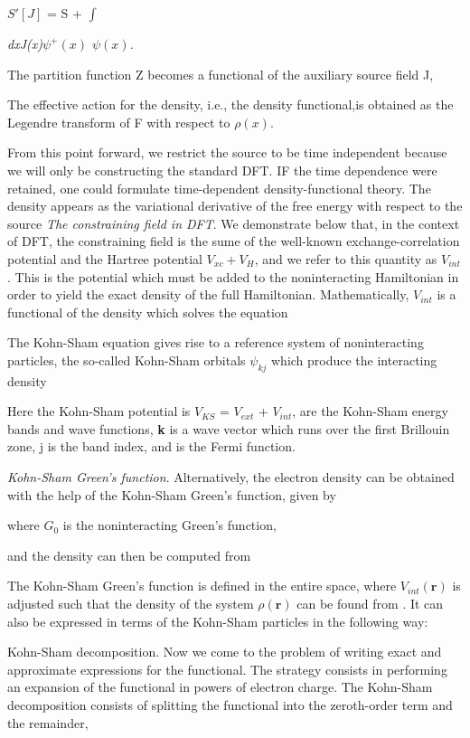 \documentclass[12 pt]{article}
\begin{document}
   $S\prime[J]$ = S + $\int $ {\emph {dx{J(x)$\psi^{+}(x)$ $\psi(x)$.}}

  The partition function Z becomes a functional of the auxiliary source field J,


  The effective action for the density, i.e., the density functional,is obtained as the Legendre transform of
 F with respect to $\rho (x)$.

  From this point forward, we restrict the source to be time independent because we will only be constructing 
the standard DFT. IF the time dependence were retained, one could formulate time-dependent density-functional
 theory. The density appears as the variational derivative of the free energy with respect to the source 
  \emph{The constraining field in DFT}. We demonstrate below that, in the context of DFT, the constraining 
field is the sume of the well-known exchange-correlation potential and the Hartree potential $V_{xc} + V_{H}$,
 and we refer to this quantity as $V_{int}$. This is the potential which must be added to the noninteracting
 Hamiltonian in order to yield the exact density of the full Hamiltonian. Mathematically, $V_{int}$ is a 
functional of the density which solves the equation

  The Kohn-Sham equation gives rise to a reference system of noninteracting particles, the so-called Kohn-Sham 
orbitals $\psi _{kj}$ which produce the interacting density

  Here the Kohn-Sham potential is $V_{KS}$ = $V_{ext}$ + $V_{int}$, are the Kohn-Sham energy bands and wave 
functions, \textbf{k} is a wave vector which runs over the first Brillouin zone, j is the band index, and 
is the Fermi function.

  \emph{Kohn-Sham Green's function}. Alternatively, the electron density can be obtained with the help of
 the Kohn-Sham Green's function, given by

   where $G_0$ is the noninteracting Green's function,

  and the density can then be computed from 

  The Kohn-Sham Green's function is defined in the entire space, where $V_{int}(\textbf{r})$ is adjusted 
such that the density of the system $\rho (\textbf{r})$ can be found from . It can also be expressed in 
terms of the Kohn-Sham particles in the following way:

  Kohn-Sham decomposition. Now we come to the problem of writing exact and approximate expressions for 
the functional. The strategy consists in performing an expansion of the functional in powers of electron
 charge. The Kohn-Sham decomposition consists of splitting the functional into the zeroth-order term and 
the remainder,

}
\end{document}
